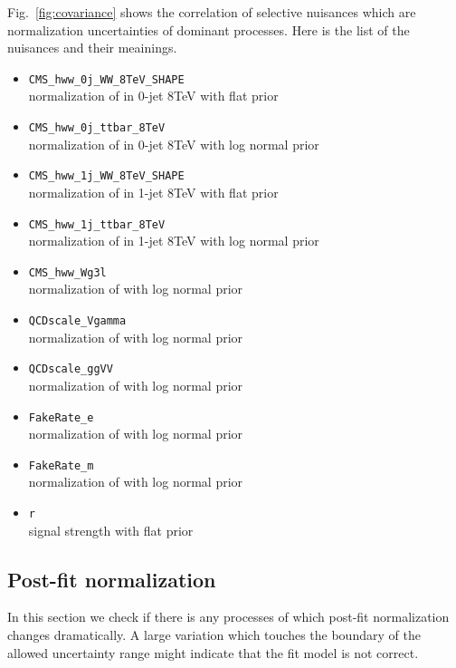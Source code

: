 Fig.~\ref{fig:covariance} shows the correlation 
of selective nuisances which are normalization uncertainties of dominant processes. 
Here is the list of the nuisances and their meainings. 
\begin{itemize} 
\item \verb|CMS_hww_0j_WW_8TeV_SHAPE|  \\ 
     normalization of \qqww{} in \DF{} 0-jet 8TeV with flat prior
\item \verb|CMS_hww_0j_ttbar_8TeV|  \\
     normalization of \topbkg{} in 0-jet 8TeV with log normal prior
\item \verb|CMS_hww_1j_WW_8TeV_SHAPE|  \\ 
     normalization of \qqww{} in \DF{} 1-jet 8TeV with flat prior 
\item \verb|CMS_hww_1j_ttbar_8TeV|  \\ 
     normalization of \topbkg{} in 1-jet 8TeV with log normal prior
\item \verb|CMS_hww_Wg3l|  \\
     normalization of \wgammastar{} with log normal prior
\item \verb|QCDscale_Vgamma|  \\
     normalization of \wgamma{} with log normal prior 
\item \verb|QCDscale_ggVV|  \\
     normalization of \ggww{} with log normal prior 
\item \verb|FakeRate_e|  \\
     normalization of \WjetsE{} with log normal prior
\item \verb|FakeRate_m|  \\
     normalization of \WjetsM{} with log normal prior 
\item \verb|r|  \\
     signal strength with flat prior 
\end{itemize}



\subsection{Post-fit normalization} 

In this section we check if there is any processes of which post-fit 
normalization changes dramatically. A large variation which touches 
the boundary of the allowed uncertainty range might indicate that 
the fit model is not correct. 

